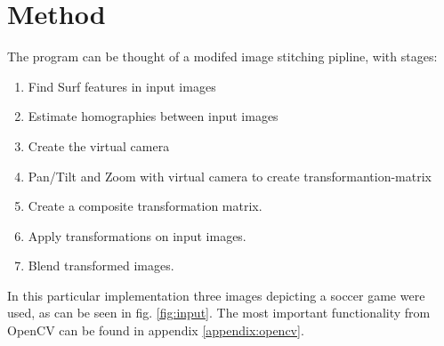 \section{Method}

The program can be thought of a modifed image stitching pipline, with stages:
\begin{enumerate}
	\item Find Surf features in input images
	\item Estimate homographies between input images
	\item Create the virtual camera
	\item Pan/Tilt and Zoom with virtual camera to create transformantion-matrix
	\item Create a composite transformation matrix.
	\item Apply transformations on input images.
	\item Blend transformed images.
\end{enumerate}

In this particular implementation three images depicting a soccer game were used, as can be seen in fig. \ref{fig:input}. The most important functionality from OpenCV can be found in appendix \ref{appendix:opencv}.

